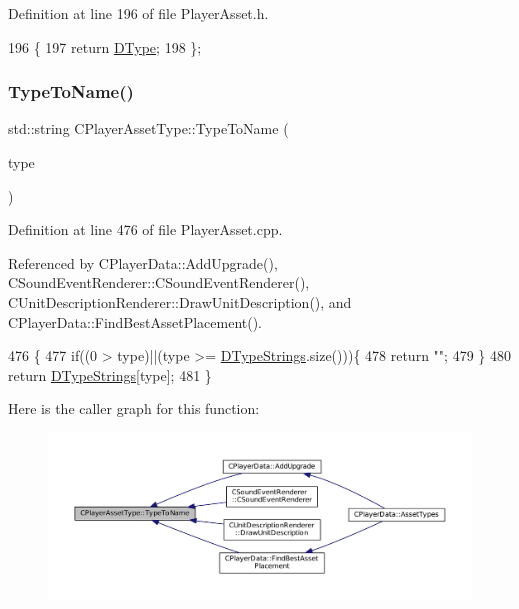 Definition at line 196 of file Player\+Asset.\+h.


\begin{DoxyCode}
196                                \{
197             \textcolor{keywordflow}{return} \hyperlink{classCPlayerAssetType_a2a52bda918a79ecf5582314ef1f61c8a}{DType};  
198         \};
\end{DoxyCode}
\hypertarget{classCPlayerAssetType_a66ce89c35b74940e9fc947a1f4b9e770}{}\label{classCPlayerAssetType_a66ce89c35b74940e9fc947a1f4b9e770} 
\subsubsection{\texorpdfstring{Type\+To\+Name()}{TypeToName()}}
{\footnotesize\ttfamily std\+::string C\+Player\+Asset\+Type\+::\+Type\+To\+Name (\begin{DoxyParamCaption}\item[{\hyperlink{GameDataTypes_8h_a5600d4fc433b83300308921974477fec}{E\+Asset\+Type}}]{type }\end{DoxyParamCaption})\hspace{0.3cm}{\ttfamily [static]}}



Definition at line 476 of file Player\+Asset.\+cpp.



Referenced by C\+Player\+Data\+::\+Add\+Upgrade(), C\+Sound\+Event\+Renderer\+::\+C\+Sound\+Event\+Renderer(), C\+Unit\+Description\+Renderer\+::\+Draw\+Unit\+Description(), and C\+Player\+Data\+::\+Find\+Best\+Asset\+Placement().


\begin{DoxyCode}
476                                                      \{
477     \textcolor{keywordflow}{if}((0 > type)||(type >= \hyperlink{classCPlayerAssetType_a1f87f6f8c42b692a500c875e9359a438}{DTypeStrings}.size()))\{
478         \textcolor{keywordflow}{return} \textcolor{stringliteral}{""};
479     \}
480     \textcolor{keywordflow}{return} \hyperlink{classCPlayerAssetType_a1f87f6f8c42b692a500c875e9359a438}{DTypeStrings}[type];
481 \}
\end{DoxyCode}
Here is the caller graph for this function\+:\nopagebreak
\begin{figure}[H]
\begin{center}
\leavevmode
\includegraphics[width=350pt]{classCPlayerAssetType_a66ce89c35b74940e9fc947a1f4b9e770_icgraph}
\end{center}
\end{figure}


